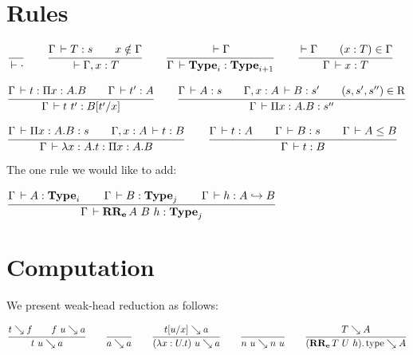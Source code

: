 \documentclass[a4paper,english]{lipics-utf8x}
\begin{document}
  \section{Rules}

  \begin{center}
  \(
    \ru{}{\der \cdot}
    \qquad
    \ru{\Gamma \der T : s \qquad
        x \notin \Gamma
      }{\der \Gamma, x : T}
    \qquad
    \ru{\der \Gamma
      }{\Gamma \der \Type_i : \Type_{i+1}}
    \qquad
    \ru{\der \Gamma \qquad
        (x : T) \in \Gamma
      }{\Gamma \der x : T}
  \)
  \end{center}

  \begin{center}
  \(
    \ru{\Gamma \der t : \Pi x:A.B \qquad
        \Gamma \der t' : A
      }{\Gamma \der t\ t' : B[t'/x]}
    \qquad
    \ru{\Gamma \der A : s \qquad
        \Gamma, x:A \der B : s' \qquad
        (s,s',s'') \in \R
      }{\Gamma \der \Pi x:A.B : s''}
  \)
  \end{center}

  \begin{center}
  \(
    \ru{\Gamma \der \Pi x:A.B : s \qquad
        \Gamma, x:A \der t : B
      }{\Gamma \der \lambda x:A.t : \Pi x:A.B}
    \qquad
    \ru{\Gamma \der t : A \qquad
        \Gamma \der B : s \qquad
        \Gamma \der A \le B
      }{\Gamma \der t : B}
  \)
  \end{center}

  The one rule we would like to add:

  \begin{center}
  \(
    \ru{\Gamma \der A : \Type_i \qquad
        \Gamma \der B : \Type_j \qquad
        \Gamma \der h : \emb{A}{B}
      }{\Gamma \der \RRe{A}{B}{h} : \Type_j}
  \)
  \end{center}

\section{Computation}

We present weak-head reduction as follows:

\begin{center}
\(
  \ru{t \rew f \qquad
      f~u \rew a
    }{t~u \rew a}
  \qquad
  \ru{}{a \rew a}
  \qquad
  \ru{t[u/x] \rew a
    }{(\lambda x:U.t)~u \rew a}
  \qquad
  \ru{}{n~u \rew n~u}
  \qquad
  \ru{T \rew A
    }{(\RRe{T}{U}{h}).\type \rew A}
\)
\end{center}
\end{document}

